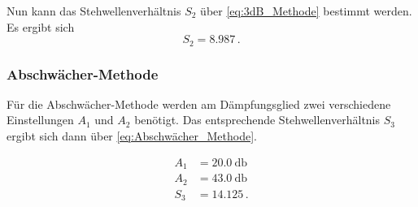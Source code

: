 Nun kann das Stehwellenverhältnis $S_2$ über \autoref{eq:3dB_Methode} bestimmt werden.
Es ergibt sich
\begin{equation*}
    S_2 = \num{8.987} \, .
\end{equation*}

\subsubsection{Abschwächer-Methode}
\label{sssec:a7}

Für die Abschwächer-Methode werden am Dämpfungsglied zwei verschiedene Einstellungen $A_1$ und $A_2$ benötigt.
Das entsprechende Stehwellenverhältnis $S_3$ ergibt sich dann über \autoref{eq:Abschwächer_Methode}.

\begin{align*}
    A_1 &= \SI{20.0}{\decibel} \\
    A_2 &= \SI{43.0}{\decibel} \\
    S_3 &= \num{14.125} \, .
\end{align*}
